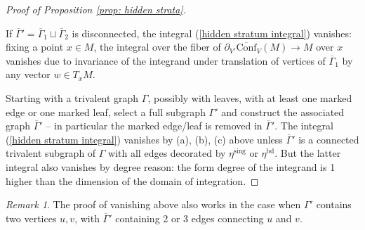 \documentclass[11pt,a4paper]{amsart}
\theoremstyle{plain} %
\theoremstyle{definition}
\theoremstyle{remark}
\newtheorem{rem}[thm]{Remark}
\newcommand{\mr}{\mathrm}
\newcommand{\ra}{\rightarrow}
\newcommand{\Conf}[1][V]{\overline{\mathrm{Conf}}_#1(M)}
\begin{document}
\begin{proof}[Proof of Proposition \ref{prop: hidden strata}]
\begin{enumerate}[(a)]
        If $\overline\Gamma'=\overline\Gamma_1\sqcup \overline\Gamma_2$ is disconnected, the integral (\ref{hidden stratum integral}) vanishes: fixing a point $x\in M$, the integral over the fiber of $\partial_{V'}\Conf\ra M$ over $x$ vanishes due to invariance of the integrand under translation of vertices of $\overline\Gamma_1$ by any vector $w\in T_xM$. 
    \end{enumerate}
    Starting with a %
    trivalent graph $\Gamma$, possibly with leaves, with at least one marked edge or one marked leaf, select a full subgraph $\Gamma'$ and construct the associated graph $\overline\Gamma'$ -- in particular the marked edge/leaf is removed in $\overline\Gamma'$. The integral (\ref{hidden stratum integral}) vanishes by (a), (b), (c) above unless $\overline\Gamma'$ is a connected trivalent subgraph of $\Gamma$ with all edges decorated by $\eta^\mr{sing}$ or $\eta^\mr{bd}$. But the latter integral also vanishes by degree reason: the form degree of the integrand is 1 higher than the dimension of the domain of integration.
\end{proof}

\begin{rem}
    The proof of vanishing above also works in the case when $\Gamma'$ contains two vertices $u,v$, with $\overline\Gamma'$ containing 2 or 3 edges connecting $u$ and $v$.
\end{rem}
\end{document}
